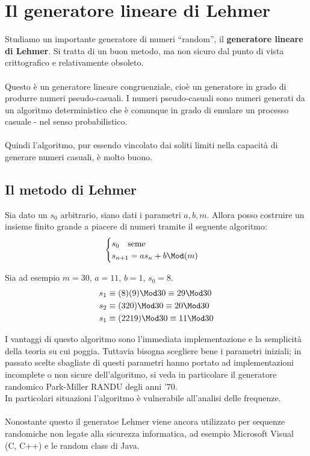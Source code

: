 \chapter{Il generatore lineare di Lehmer}
Studiamo un importante generatore di numeri \enquote{random}, il \textbf{generatore lineare di Lehmer}. Si tratta di un buon metodo, ma non sicuro dal punto di vista crittografico e relativamente obsoleto. \\ \\ Questo è un generatore lineare congruenziale, cioè un generatore in grado di produrre numeri pseudo-casuali. I numeri pseudo-casuali sono numeri generati da un algoritmo deterministico che è comunque in grado di emulare un processo casuale - nel senso probabilistico. \\ \\ Quindi l'algoritmo, pur essendo vincolato dai soliti limiti nella capacità di generare numeri casuali, è molto buono.
\section{Il metodo di Lehmer}
Sia dato un $s_0$ arbitrario, siano dati i parametri $a,b,m$. Allora posso costruire un insieme finito grande a piacere di numeri tramite il seguente algoritmo:
\begin{equation*}
\begin{cases}
s_0 \ \ \ \text{seme}\\
s_{n+1}=as_n+b\Mod(m)
\end{cases}
\end{equation*}
\begin{esempio}
	Sia ad esempio $m=30$, $a=11$, $b=1$, $s_0=8$.
	\begin{align*}
	s_1&\equiv(8)(9)\Mod30\equiv29\Mod30\\
	s_2&\equiv(320)\Mod30\equiv20\Mod30\\
	s_1&\equiv(2219)\Mod30\equiv11\Mod30
	\end{align*}
\end{esempio}
I vantaggi di questo algoritmo sono l'immediata implementazione e la semplicità della teoria su cui poggia. Tuttavia bisogna scegliere bene i parametri iniziali; in passato scelte sbagliate di questi parametri hanno portato ad implementazioni incomplete o non sicure dell'algoritmo, si veda in particolare il generatore randomico Park-Miller \textsf{RANDU} degli anni '70. \\ In particolari situazioni l'algoritmo è vulnerabile all'analisi delle frequenze. \\ \\ Nonostante questo il generatoe Lehmer viene ancora utilizzato per sequenze randomiche non legate alla sicurezza informatica, ad esempio \textsf{Microsoft Visual} (C, C++) e le random class di \textsf{Java}.

